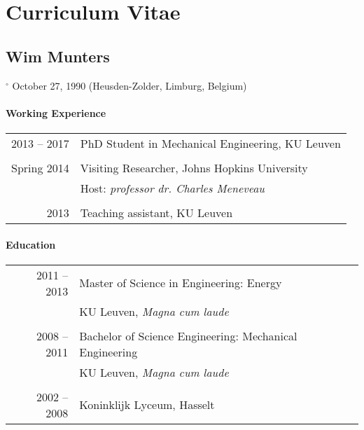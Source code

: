 \chapter{Curriculum Vitae}\label{ch:curriculum}

\section*{Wim Munters}
$^\circ$ October 27, 1990 (Heusden-Zolder, Limburg, Belgium)

\subsubsection*{Working Experience}
\begin{tabular}{rl}
	2013 -- 2017 		& 		PhD Student in Mechanical Engineering, KU Leuven\\ 
	&\\
	Spring 2014		& 		Visiting Researcher, Johns Hopkins University\\
		&  		Host: \textit{professor dr. Charles Meneveau}\\
		&\\
	2013  		& 		Teaching assistant, KU Leuven\\ 
\end{tabular} 


\subsubsection*{Education}
\begin{tabular}{rl}
	2011 -- 2013 		& 		Master of Science in Engineering: Energy\\ 
	&  		KU Leuven, \textit{Magna cum laude}\\

	&\\	
	2008 -- 2011 		& 		Bachelor of Science Engineering: Mechanical Engineering\\ 
	&  		KU Leuven, \textit{Magna cum laude}\\
	&\\	
	2002 -- 2008 		& 		Koninklijk Lyceum, Hasselt\\ 
\end{tabular} 

\cleardoublepage

